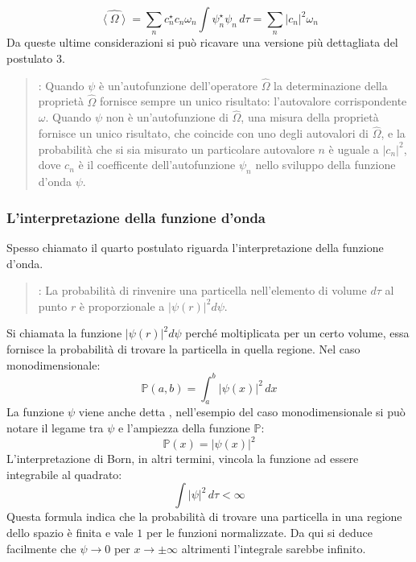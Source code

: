 $$\hat{\left \langle \Omega \right \rangle} = \sum_{n} c_n^{\star} c_n \omega_n \int \psi_n^{\star} \psi_n \, d\tau = \sum_n {\left| c_n \right|}^2 \omega_n$$
Da queste ultime considerazioni si può ricavare una versione più dettagliata del postulato 3.
\begin{quote}
  : Quando $\psi$ è un'autofunzione dell'operatore $\hat{\Omega}$ la determinazione della proprietà $\hat{\Omega}$ fornisce sempre un unico risultato: l'autovalore corrispondente $\omega$. Quando $\psi$ non è un'autofunzione di $\hat{\Omega}$, una misura della proprietà fornisce un unico risultato, che coincide con uno degli autovalori di $\hat{\Omega}$, e la probabilità che si sia misurato un particolare autovalore $n$ è uguale a ${\left|c_n\right|}^2$, dove $c_n$ è il coefficente dell'autofunzione $\psi_n$ nello sviluppo della funzione d'onda $\psi$.
\end{quote}

\subsubsection{L'interpretazione della funzione d'onda}
Spesso chiamato  il quarto postulato riguarda l'interpretazione della funzione d'onda.
\begin{quote}
  : La probabilità di rinvenire una particella nell'elemento di volume $d\tau$ al punto $r$ è proporzionale a ${\left|\psi(r)\right|}^2 d\psi$.
\end{quote}
Si chiamata  la funzione ${\left|\psi(r)\right|}^2 d\psi$ perché moltiplicata per un certo volume, essa fornisce la probabilità di trovare la particella in quella regione. Nel caso monodimensionale:
$$\mathbb{P}(a, b) = \int_a^b {\left|\psi(x)\right|}^2 \, dx$$
La funzione $\psi$ viene anche detta , nell'esempio del caso monodimensionale si può notare il legame tra $\psi$ e l'ampiezza della funzione $\mathbb{P}$:
$$\mathbb{P}(x) = {\left|\psi(x)\right|}^2$$
L'interpretazione di Born, in altri termini, vincola la funzione ad essere integrabile al quadrato:
$$\int {\left|\psi\right|}^2 \, d\tau < \infty$$
Questa formula indica che la probabilità di trovare una particella in una regione dello spazio è finita e vale $1$ per le funzioni normalizzate. Da qui si deduce facilmente che $\psi \to 0$ per $ x \to \pm \infty$ altrimenti l'integrale sarebbe infinito.

